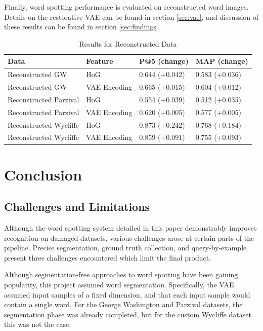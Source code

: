 \documentclass[final]{ukthesis}
\begin{document}
Finally, word spotting performance is evaluated on reconstructed word images. Details on the restorative VAE can be found in section \ref{sec:vae}, and discussion of these results can be found in section \ref{sec:findings}.

\begin{table}[h]
\centering
\begin{tabular}{llll}
\textbf{Data}  & \textbf{Feature} & \textbf{P@5 (change)} & \textbf{MAP (change)} \\
\hline
Reconstructed GW    & HoG			& 0.644 (+0.042)          & 0.583 (+0.036)         \\
Reconstructed GW    & VAE Encoding 	& 0.665 (+0.015)         & 0.604 (+0.012)         \\
Reconstructed Parzival & HoG                     & 0.554 (+0.039)         & 0.512 (+0.035)         \\
Reconstructed Parzival & VAE Encoding 	& 0.620 (+0.005)         & 0.577 (+0.005)         \\
Reconstructed Wycliffe & HoG                     & 0.873 (+0.242)         & 0.768 (+0.184)         \\
Reconstructed Wycliffe & VAE Encoding 	& 0.859 (+0.091)         & 0.755 (+0.093)         \\
\end{tabular}
\caption{Results for Reconstructed Data}
\label{tab:reconstructed-results}
\end{table}





%
%
%
\chapter{Conclusion}

\section{Challenges and Limitations}
\label{sec:challenges}
Although the word spotting system detailed in this paper demonstrably improves recognition on damaged datasets, various challenges arose at certain parts of the pipeline. Precise segmentation, ground truth collection, and query-by-example present three challenges encountered which limit the final product.

Although segmentation-free approaches to word spotting have been gaining popularity, this project assumed word segmentation. Specifically, the VAE assumed input samples of a fixed dimension, and that each input sample would contain a single word. For the George Washington and Parzival datasets, the segmentation phase was already completed, but for the custom Wycliffe dataset this was not the case.
\end{document}
